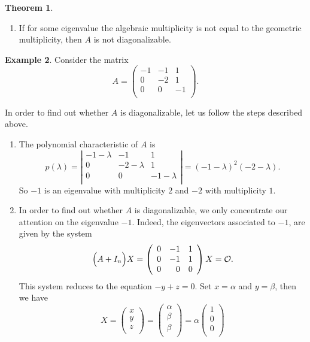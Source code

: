 \documentclass[11pt]{article}
\theoremstyle{definition}
\newtheorem{thm}{Theorem}[section]
\newtheorem{exmp}[thm]{Example}
\theoremstyle{plain}
\begin{document}
\begin{thm}
\begin{enumerate}
  \item If for some eigenvalue the algebraic multiplicity is not equal to the geometric multiplicity, then $A$ is not diagonalizable.
\end{enumerate}
\end{thm}
\begin{exmp}
Consider the matrix
\[
A = \left(\begin{array}{rrr} -1&-1&1\\ 0&-2&1\\ 0&0&-1\\ \end{array}\right).
\]

In order to find out whether $A$ is diagonalizable, let us follow the steps described above.
\begin{enumerate}
  \item The polynomial characteristic of $A$ is
\[
p(\lambda) =
\left\vert\begin{array}{rrr}
-1-\lambda&-1&1\\
0&-2-\lambda &1\\
0& 0&-1-\lambda\\
 \end{array}\right\vert = (-1 -\lambda)^2(-2 - \lambda).
\]
So $-1$ is an eigenvalue with multiplicity $2$ and $-2$ with multiplicity $1$.
  \item In order to find out whether $A$ is diagonalizable, we only concentrate our attention on the eigenvalue $-1$. Indeed, the eigenvectors associated to $-1$, are given by the system
\[
\Big(A + I_n \Big) X = \left(\begin{array}{rrr} 0&-1&1\\ 0&-1&1\\ 0&0&0\\ \end{array}\right) X= {\cal O}.
\]
This system reduces to the equation $-y + z = 0$. Set $x = \alpha$ and $y = \beta$, then we have
\[
X = \left(\begin{array}{r} x\\ y\\ z\\ \end{array}\right)
=\left(\begin{array}{r} \alpha\\ \beta\\ \beta\\ \end{array}\right)
=\alpha\left(\begin{array}{r} 1\\ 0\\ 0\\ \end{array}\right)
\]
\end{enumerate}
\end{exmp}
\end{document}
